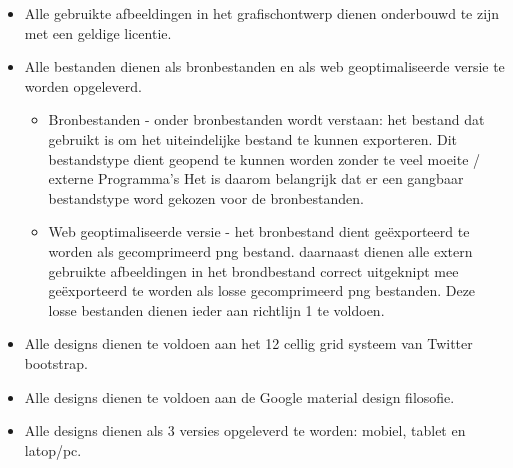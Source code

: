 \documentclass[]{report}
\begin{document}
\vspace{5mm} %

\begin{itemize}
	\item Alle gebruikte afbeeldingen in het grafischontwerp dienen onderbouwd te zijn met een geldige licentie.
	\item Alle bestanden dienen als bronbestanden en als web geoptimaliseerde versie te worden opgeleverd.
	\begin{itemize}
		\item Bronbestanden - onder bronbestanden wordt verstaan: het bestand dat gebruikt is om het uiteindelijke bestand te kunnen exporteren. Dit bestandstype dient geopend te kunnen worden zonder te veel moeite / externe Programma's Het is daarom belangrijk dat er een gangbaar bestandstype word gekozen voor de bronbestanden.
		\item Web geoptimaliseerde versie - het bronbestand dient ge\"{e}xporteerd te worden als gecomprimeerd png bestand. daarnaast dienen alle extern gebruikte afbeeldingen in het brondbestand correct uitgeknipt mee ge\"{e}xporteerd te worden als losse gecomprimeerd png bestanden. Deze losse bestanden dienen ieder aan richtlijn 1 te voldoen.
		\newline
	\end{itemize} 
	\item Alle designs dienen te voldoen aan het 12 cellig grid systeem van Twitter bootstrap.
	\item Alle designs dienen te voldoen aan de Google material design filosofie.
	\item Alle designs dienen als 3 versies opgeleverd te worden: mobiel, tablet en latop/pc.
	\newline
\end{itemize} 
\end{document}
